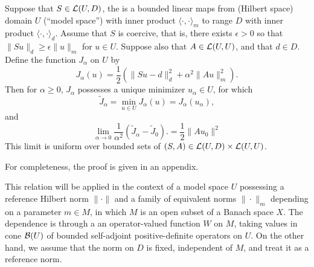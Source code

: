 \begin{theorem}
  \label{thm:basic}
Suppose that $S \in {\cal L}(U,D)$, the is a bounded linear maps from (Hilbert space) domain $U$ (``model space'') with inner product $\langle \cdot, \cdot \rangle_m$ to range $D$ with inner product $\langle \cdot, \cdot \rangle_d$. Assume that $S$ is coercive, that is, there exists $\epsilon >0$ so that $\|Su\|_d \ge \epsilon\|u\|_m$ for $u \in U$.
Suppose also that $A \in {\cal L}(U,U)$, and that $d \in D$. Define the function $J_{\alpha}$ on $U$ by 
\begin{equation}
  \label{eqn:eq1}
  J_{\alpha}(u) = \frac{1}{2}(\|Su-d\|^2_d + \alpha^2\|Au\|_m^2).
\end{equation}
Then for $\alpha \ge 0$, $J_{\alpha}$ possesses a unique minimizer $u_{\alpha} \in U$, for which
\begin{equation}
  \label{eqn:eq0}
  \tilde{J}_{\alpha} = \min_{u \in U} J_{\alpha}(u) = J_{\alpha}(u_{\alpha}),
\end{equation}
and
\begin{equation}
  \label{eqn:eq4}
  \lim_{\alpha \rightarrow 0} \frac{1}{\alpha^2}  (\tilde{J}_{\alpha}-\tilde{J}_0).= \frac{1}{2}\|Au_0\|^2
\end{equation}
This limit is uniform over bounded sets of $(S, A) \in {\cal L}(U,D) \times {\cal L}(U, U)$.
\end{theorem}

For completeness, the proof is given in an appendix.

This relation will be applied in the context of a model space $U$ possessing a reference Hilbert norm $\|\cdot\|$ and a family of equivalent norms $\|\cdot\|_m$ depending on a parameter $m \in M$, in which $M$ is an open subset of a Banach space $X$. The dependence is through a an operator-valued function $W$ on $M$, taking values in cone ${\cal B}(U)$ of bounded self-adjoint positive-definite operators on $U$. On the other hand, we assume that the norm on $D$ is fixed, independent of $M$, and treat it as a reference norm.

